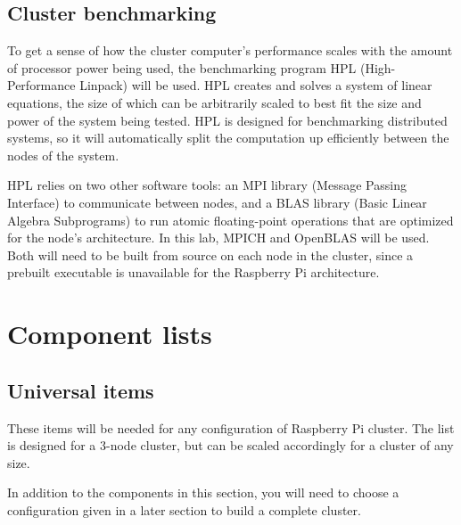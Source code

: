\documentclass{article}
\begin{document}
\subsection{Cluster benchmarking}

To get a sense of how the cluster computer's performance scales with the amount of processor power being used, the benchmarking program HPL (High-Performance Linpack) will be used. HPL creates and solves a system of linear equations, the size of which can be arbitrarily scaled to best fit the size and power of the system being tested. HPL is designed for benchmarking distributed systems, so it will automatically split the computation up efficiently between the nodes of the system.

HPL relies on two other software tools: an MPI library (Message Passing Interface) to communicate between nodes, and a BLAS library (Basic Linear Algebra Subprograms) to run atomic floating-point operations that are optimized for the node's architecture. In this lab, MPICH and OpenBLAS will be used. Both will need to be built from source on each node in the cluster, since a prebuilt executable is unavailable for the Raspberry Pi architecture.

\section{Component lists}

\subsection{Universal items}
These items will be needed for any configuration of Raspberry Pi cluster. The list is designed for a 3-node cluster, but can be scaled accordingly for a cluster of any size. 

In addition to the components in this section, you will need to choose a configuration given in a later section to build a complete cluster.
\end{document}
